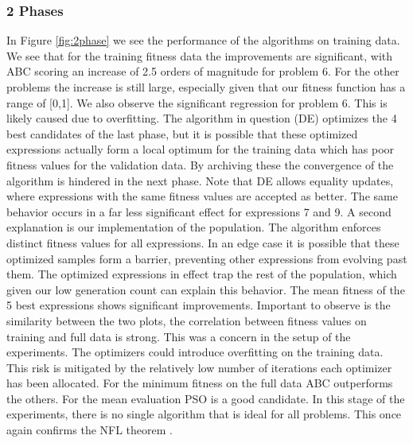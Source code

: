 \subsubsection{2 Phases}
In Figure \ref{fig:2phase} we see the performance of the algorithms on training data. 
We see that for the training fitness data the improvements are significant, with ABC scoring an increase of 2.5 orders of magnitude for problem 6. For the other problems the increase is still large, especially given that our fitness function has a range of [0,1].
We also observe the significant regression for problem 6. This is likely caused due to overfitting. The algorithm in question (DE) optimizes the 4 best candidates of the last phase, but it is possible that these optimized expressions actually form a local optimum for the training data which has poor fitness values for the validation data. By archiving these the convergence of the algorithm is hindered in the next phase. Note that DE allows equality updates, where expressions with the same fitness values are accepted as better. The same behavior occurs in a far less significant effect for expressions 7 and 9. A second explanation is our implementation of the population. The algorithm enforces distinct fitness values for all expressions. In an edge case it is possible that these optimized samples form a barrier, preventing other expressions from evolving past them. The optimized expressions in effect trap the rest of the population, which given our low generation count can explain this behavior. The mean fitness of the 5 best expressions shows significant improvements. Important to observe is the similarity between the two plots, the correlation between fitness values on training and full data is strong. This was a concern in the setup of the experiments. The optimizers could introduce overfitting on the training data. This risk is mitigated by the relatively low number of iterations each optimizer has been allocated. For the minimum fitness on the full data ABC outperforms the others. For the mean evaluation PSO is a good candidate. In this stage of the experiments, there is no single algorithm that is ideal for all problems. This once again confirms the NFL theorem \cite{NFL}.
